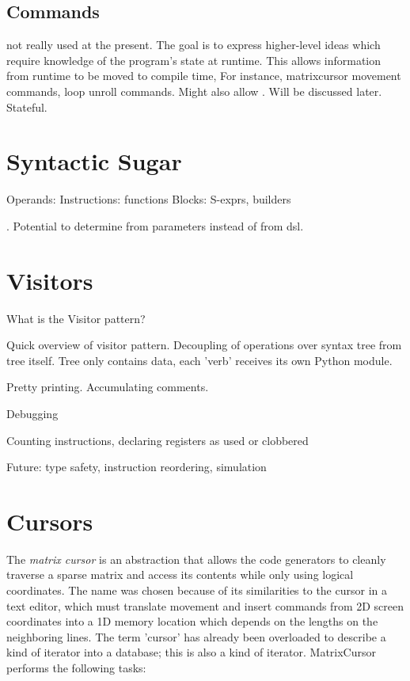 \subsection{Commands}
not really used at the present. The goal is to express higher-level ideas which require knowledge of the program's state at runtime. This allows information from runtime to be moved to compile time, For instance, matrixcursor movement commands, loop unroll commands. Might also allow . Will be discussed later. Stateful.


\section{Syntactic Sugar}

Operands:
Instructions: functions
Blocks: S-exprs, builders


. Potential to determine from parameters instead of from dsl. 


\section{Visitors}

What is the Visitor pattern?

Quick overview of visitor pattern. Decoupling of operations over syntax tree from tree itself. Tree only contains data, each 'verb' receives its own Python module.


Pretty printing. Accumulating comments.

Debugging

Counting instructions, declaring registers as used or clobbered

Future: type safety, instruction reordering, simulation


\section{Cursors}

    The \emph{matrix cursor} is an abstraction that allows the code generators to cleanly traverse a sparse matrix and access its contents while only using logical coordinates. The name was chosen because of its similarities to the cursor in a text editor, which must translate movement and insert commands from 2D screen coordinates into a 1D memory location which depends on the lengths on the neighboring lines. The term 'cursor' has already been overloaded to describe a kind of iterator into a database; this is also a kind of iterator. MatrixCursor performs the following tasks:

